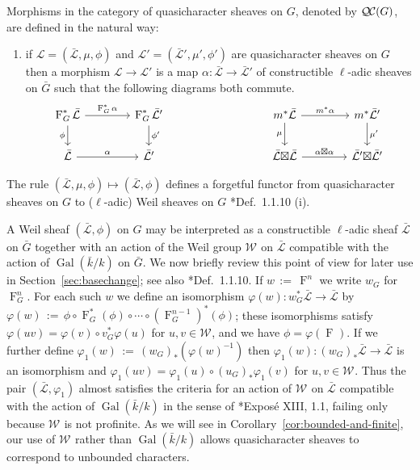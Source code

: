 \documentclass{amsart}
\makeatletter
\theoremstyle{plain}
\theoremstyle{definition}
\theoremstyle{remark}
\newcommand{\bFq}{\bar{k}}
\newcommand{\Fq}{k}
\newcommand{\Weil}[1]{\mathcal{W}_{#1}}
\DeclareMathOperator{\Gal}{Gal}
\newcommand{\Frob}[1]{\operatorname{F}_{#1}}
\newcommand{\ceq}{{\, :=\, }}
\newcommand{\qcs}[1]{{\mathcal{#1}}}
\newcommand{\gqcs}[1]{{\mathcal{\bar #1}}}
\newcommand{\QC}{{\mathcal{Q\hskip-0.8pt C}}}
\newcommand{\labitem}[2]{
\def\@itemlabel{\textbf{#1}}
\item
\def\@currentlabel{#1}\label{#2}}
\newcommand{\bG}{\bar{G}}
\newcommand{\tight}[3]{\hspace{-#1pt}{#2}\hspace{-#3pt}}
\newcommand{\LxL}{\text{$\gqcs{L} \tight{0}{\boxtimes}{0} \gqcs{L}$}}
\makeatother
\begin{document}
Morphisms in the category of quasicharacter sheaves on $G$, denoted by $\QC(G)$, are defined in the natural way:
\begin{enumerate}
\labitem{(QC.4)}{QC.4} if $\qcs{L} = (\gqcs{L},\mu,\phi)$ and
  $\qcs{L'} = (\gqcs{L'},\mu',\phi')$ are quasicharacter sheaves on $G$ then
  a morphism $\qcs{L} \to \qcs{L}'$ is a map $\alpha : \gqcs{L} \to \gqcs{L'}$
  of constructible $\ell$-adic sheaves on $\bG$ such that the following diagrams both commute.
  \[
  \begin{tikzcd}[column sep=40]
  \Frob{G}^* \gqcs{L} \rar{\Frob{G}^* \alpha} \arrow[swap]{d}{\phi} & \Frob{G}^* \gqcs{L'} \dar{\phi'}
  & & \arrow[swap]{d}{\mu} m^* \gqcs{L} \rar{m^* \alpha} & m^* \gqcs{L'} \dar{\mu'} \\
  \gqcs{L} \rar{\alpha} & \gqcs{L'}
  & {} & \LxL \rar{\tight{1}{\alpha\boxtimes \alpha}{1}} & \gqcs{L'} \tight{0}{\boxtimes}{0} \gqcs{L'}
  \end{tikzcd}
  \]
\end{enumerate}

The rule $(\gqcs{L},\mu,\phi) \mapsto (\gqcs{L},\phi)$ defines a forgetful functor from quasicharacter
sheaves on $G$ to ($\ell$-adic) Weil sheaves on $G$ \cite{deligne:80a}*{Def.~1.1.10 (i)}.

A Weil sheaf $(\gqcs{L},\phi)$ on $G$
may be interpreted as a constructible $\ell$-adic sheaf $\gqcs{L}$ on $\bG$ together with
an action of the Weil group $\Weil{}$ on $\gqcs{L}$ compatible with the action of
$\Gal(\bFq/\Fq)$ on $\bG$. We now briefly review this point of view for later use in
Section~\ref{sec:basechange}; see also \cite{deligne:80a}*{Def.~1.1.10}.  If $w \ceq \Frob{}^n$ we write $w_G$ for $\Frob{G}^n$.
For each such $w$ we define an isomorphism $\varphi(w) : w_G^* \gqcs{L}\to \gqcs{L}$ by
$
\varphi(w) \ceq  \phi \circ \Frob{G}^*(\phi) \circ \cdots \circ (\Frob{G}^{n-1})^*(\phi)
$; 
these isomorphisms satisfy $\varphi(uv) = \varphi(v) \circ v_G^* \varphi(u)$ for $u,v\in \Weil{}$, and
we have $\phi = \varphi(\Frob{})$. 
If we further define $\varphi_1(w) \ceq (w_G)_*(\varphi(w)^{-1})$ then
$\varphi_1(w) : (w_G)_* \gqcs{L}\to \gqcs{L}$ is an isomorphism and
$\varphi_1(uv) = \varphi_1(u) \circ (u_G)_* \varphi_1(v)$ for $u,v\in \Weil{}$.
Thus the pair $(\gqcs{L},\varphi_1)$ almost satisfies the criteria for an action of $\Weil{}$
on $\gqcs{L}$ compatible with the action of $\Gal(\bFq/\Fq)$ in the sense of
\cite{deligne:SGA4.5}*{Expos\'e XIII, 1.1}, failing only because $\Weil{}$ is not profinite.
As we will see in Corollary~\ref{cor:bounded-and-finite}, our use of $\Weil{}$ rather than $\Gal(\bFq/\Fq)$
allows quasicharacter sheaves to correspond to unbounded characters.
\end{document}

